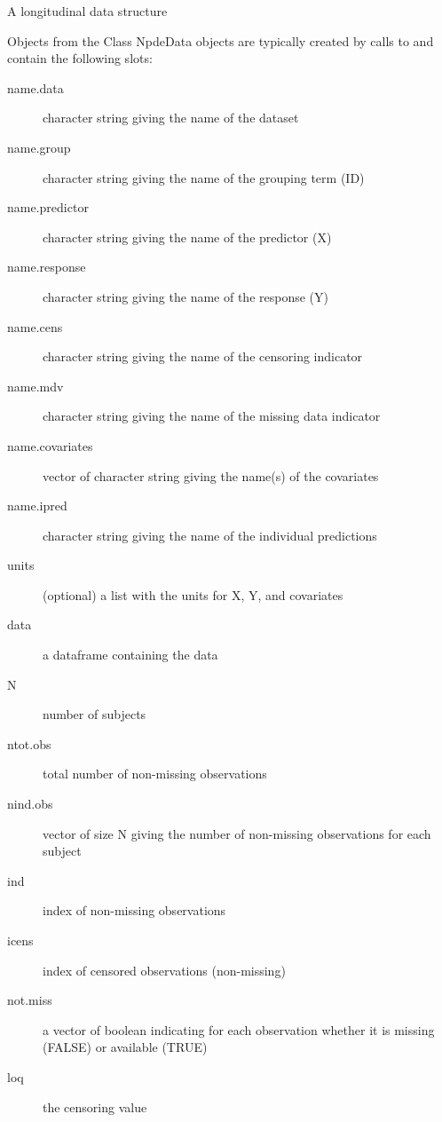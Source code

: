 \documentclass[a4paper]{book}
\begin{document}
\aliasA{[,NpdeData-method}{NpdeData-class}{[,NpdeData.Rdash.method}
\aliasA{[<\Rdash{},NpdeData-method}{NpdeData-class}{[<.Rdash.,NpdeData.Rdash.method}
%
\begin{Description}\relax
A longitudinal data structure
\end{Description}
%
\begin{Section}{Objects from the Class}
NpdeData objects are typically created by calls to  and contain the following slots:

\begin{description}

\item[name.data] character string giving the name of the dataset
\item[name.group] character string giving the name of the grouping term (ID)
\item[name.predictor] character string giving the name of the predictor (X)
\item[name.response] character string giving the name of the response (Y)
\item[name.cens] character string giving the name of the censoring indicator
\item[name.mdv] character string giving the name of the missing data indicator
\item[name.covariates] vector of character string giving the name(s) of the covariates
\item[name.ipred] character string giving the name of the individual predictions
\item[units] (optional) a list with the units for X, Y, and covariates
\item[data] a dataframe containing the data
\item[N] number of subjects
\item[ntot.obs] total number of non-missing observations
\item[nind.obs] vector of size N giving the number of non-missing observations for each subject
\item[ind] index of non-missing observations
\item[icens] index of censored observations (non-missing)
\item[not.miss] a vector of boolean indicating for each observation whether it is missing (FALSE) or available (TRUE)
\item[loq] the censoring value

\end{description}

\end{Section}
\end{document}

